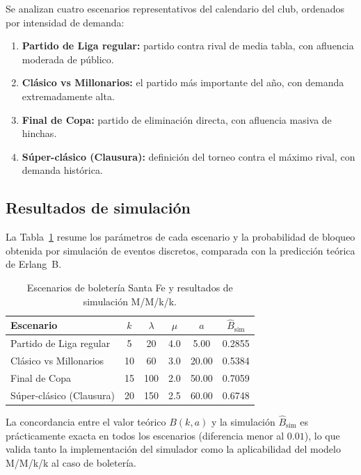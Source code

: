 Se analizan cuatro escenarios representativos del calendario del club,
ordenados por intensidad de demanda:

\begin{enumerate}
    \item \textbf{Partido de Liga regular:} partido contra rival de media tabla,
          con afluencia moderada de público.
    \item \textbf{Clásico vs Millonarios:} el partido más importante del año,
          con demanda extremadamente alta.
    \item \textbf{Final de Copa:} partido de eliminación directa, con afluencia
          masiva de hinchas.
    \item \textbf{Súper-clásico (Clausura):} definición del torneo contra el
          máximo rival, con demanda histórica.
\end{enumerate}

\subsection{Resultados de simulación}

La Tabla~\ref{tab:santa_fe_resultados} resume los parámetros de cada escenario
y la probabilidad de bloqueo obtenida por simulación de eventos discretos,
comparada con la predicción teórica de Erlang~B.

\begin{table}[H]
\centering
\caption{Escenarios de boletería Santa Fe y resultados de simulación M/M/k/k.}
\label{tab:santa_fe_resultados}
\begin{tabular}{lccccc}
\toprule
\textbf{Escenario} & $k$ & $\lambda$ & $\mu$ & $a$ & $\hat{B}_{\mathrm{sim}}$ \\
\midrule
Partido de Liga regular & 5 & 20 & 4.0 & 5.00 & 0.2855 \\
Clásico vs Millonarios & 10 & 60 & 3.0 & 20.00 & 0.5384 \\
Final de Copa & 15 & 100 & 2.0 & 50.00 & 0.7059 \\
Súper-clásico (Clausura) & 20 & 150 & 2.5 & 60.00 & 0.6748 \\
\bottomrule
\end{tabular}
\end{table}

\begin{remark}
La concordancia entre el valor teórico $B(k,a)$ y la simulación $\hat{B}_{\mathrm{sim}}$
es prácticamente exacta en todos los escenarios (diferencia menor al $0.01$),
lo que valida tanto la implementación del simulador como la aplicabilidad del
modelo M/M/k/k al caso de boletería.
\end{remark}


